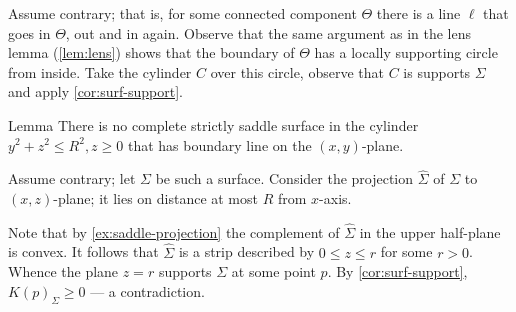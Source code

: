 Assume contrary; that is, for some connected component $\Theta$ there is a line $\ell$ that goes in $\Theta$, out and in again.
Observe that the same argument as in the lens lemma (\ref{lem:lens}) shows that the boundary of $\Theta$ has a locally supporting circle from inside.
Take the cylinder $C$ over this circle, observe that $C$ is supports $\Sigma$ and apply \ref{cor:surf-support}.

\begin{thm}{Lemma}
There is no complete strictly saddle surface in the cylinder $y^2+z^2\le R^2, z\ge 0$ that has boundary line on the $(x,y)$-plane.
\end{thm}

Assume contrary; let $\Sigma$ be such a surface.
Consider the projection $\hat\Sigma$ of $\Sigma$ to $(x,z)$-plane;
it lies on distance at most $R$ from $x$-axis.

Note that by \ref{ex:saddle-projection} the complement of $\hat\Sigma$ in the upper half-plane is convex.
It follows that $\hat\Sigma$ is a strip described by $0\le z\le r$ for some $r>0$.
Whence the plane $z=r$ supports $\Sigma$ at some point $p$. 
By \ref{cor:surf-support}, $K(p)_\Sigma\ge0$ --- a contradiction.
\qeds




























